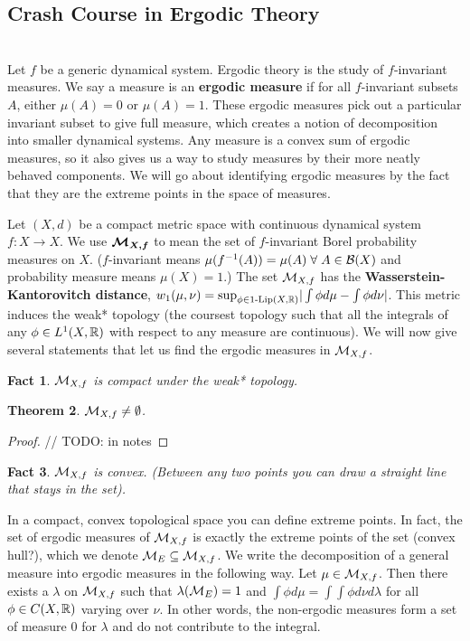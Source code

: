 \documentclass[11pt, reqno]{amsart}
\theoremstyle{plain}
\newtheorem{thm}{Theorem}[section]
\numberwithin{thm}{subsection}
\newtheorem{fact}[thm]{Fact}
\theoremstyle{definition}
\begin{document}
\subsection{Crash Course in Ergodic Theory}\cite[L10]{wolf} \\
Let $f$ be a generic dynamical system. Ergodic theory is the study of $f$-invariant measures. We say a measure is an \textbf{ergodic measure} if for all $f$-invariant subsets $A$, either $\mu(A) = 0$ or $\mu(A) = 1$. These ergodic measures pick out a particular invariant subset to give full measure, which creates a notion of decomposition into smaller dynamical systems. Any measure is a convex sum of ergodic measures, so it also gives us a way to study measures by their more neatly behaved components. We will go about identifying ergodic measures by the fact that they are the extreme points in the space of measures. 

Let $(X, d)$ be a compact metric space with continuous dynamical system $f: X \rightarrow X$. We use $\boldsymbol{\mathcal{M}_{X,f}}$ to mean the set of $f$-invariant Borel probability measures on $X$. ($f$-invariant means $\mu(f^{-1}(A)) = \mu(A) \;\forall\; A \in \mathcal{B}(X)$ and probability measure means $\mu(X) = 1$.) The set $\mathcal{M}_{X,f}$ has the \textbf{Wasserstein-Kantorovitch distance}, $w_1(\mu, \nu) = \text{sup}_{\phi \in 1\text{-Lip}(X,\mathbb{R})}|\int \phi d\mu - \int \phi d\nu|$. This metric induces the weak* topology (the coursest topology such that all the integrals of any $\phi \in L^1(X, \mathbb{R})$ with respect to any measure are continuous). We will now give several statements that let us find the ergodic measures in $\mathcal{M}_{X,f}$.

\begin{fact}
  $\mathcal{M}_{X,f}$ is compact under the weak* topology.
\end{fact}

\begin{thm}
  $\mathcal{M}_{X,f} \neq \emptyset$. 
\end{thm}

\begin{proof}
  // TODO: in notes
\end{proof}

\begin{fact}
  $\mathcal{M}_{X,f}$ is convex. (Between any two points you can draw a straight line that stays in the set).
\end{fact}

In a compact, convex topological space you can define extreme points. In fact, the set of ergodic measures of $\mathcal{M}_{X,f}$ is exactly the extreme points of the set (convex hull?), which we denote $\mathcal{M}_E \subseteq \mathcal{M}_{X,f}$. We write the decomposition of a general measure into ergodic measures in the following way. Let $\mu \in \mathcal{M}_{X,f}$. Then there exists a $\lambda$ on $\mathcal{M}_{X,f}$ such that $\lambda(\mathcal{M}_E) = 1$ and $\int \phi d\mu = \int \int \phi d\nu d\lambda$ for all $\phi \in C(X, \mathbb{R})$ varying over $\nu$. In other words, the non-ergodic measures form a set of measure 0 for $\lambda$ and do not contribute to the integral.
\end{document}
